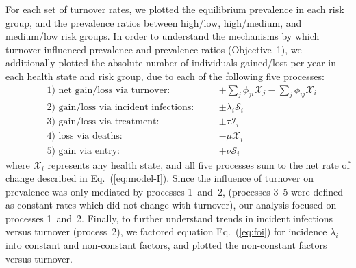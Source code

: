 For each set of turnover rates,
we plotted the equilibrium prevalence in each risk group,
and the prevalence ratios between high/low, high/medium, and medium/low risk groups.
In order to understand the mechanisms by which
turnover influenced prevalence and prevalence ratios (Objective~1),
we additionally plotted the absolute number of individuals gained/lost per year
in each health state and risk group, due to each of the following five processes:
\begin{subequations}
\begin{alignat}{3}
  &\text{1)~net gain/loss via turnover:}       \quad&&
    + \textstyle\sum_j \phi_{ji} \mathcal{X}_j - \textstyle\sum_j \phi_{ij} \mathcal{X}_i\\
  &\text{2)~gain/loss via incident infections:}\quad&& \pm \lambda_i \mathcal{S}_i\\
  &\text{3)~gain/loss via treatment:}          \quad&& \pm \tau \mathcal{I}_i\\
  &\text{4)~loss via deaths:}                  \quad&& -\mu \mathcal{X}_i\\
  &\text{5)~gain via entry:}                   \quad&& +\nu \mathcal{S}_i
\end{alignat}
\end{subequations}
where $\mathcal{X}_i$ represents any health state,
and all five processes sum to the net rate of change described in Eq.~(\ref{eq:model-I}).
Since the influence of turnover on prevalence was only mediated by processes 1~and~2,
(processes 3--5 were defined as constant rates which did not change with turnover),
our analysis focused on processes 1~and~2.
Finally, to further understand trends in incident infections versus turnover (process~2),
we factored equation Eq.~(\ref{eq:foi}) for incidence $\lambda_i$
into constant and non-constant factors,
and plotted the non-constant factors versus turnover.
